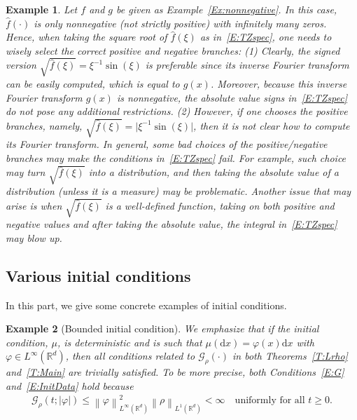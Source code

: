 \documentclass[sn-mathphys]{sn-jnl}%
\renewcommand{\R}{\mathbb{R}}
\newcommand{\Norm}[1]{\left\| #1 \right\|}
\newcommand{\ud}{\ensuremath{\mathrm{d}}}
\numberwithin{equation}{section}
\theoremstyle{thmstyleone}%
\theoremstyle{thmstyletwo}%
\newtheorem{example}{Example}[section]%
\theoremstyle{thmstylethree}%
\begin{document}
\begin{example}\label{Ex:sqrt}
  Let $f$ and $g$ be given as Example~\ref{Ex:nonnegative}. In this case, $\widehat{f}(\cdot)$ is
  only nonnegative (not strictly positive) with infinitely many zeros. Hence, when taking the square
  root of $\widehat{f}(\xi)$ as in~\eqref{E:TZspec}, one needs to wisely select the correct positive
  and negative branches: (1) Clearly, the signed version $\sqrt{\widehat{f}(\xi)} =
  \xi^{-1}\sin(\xi)$ is preferable since its inverse Fourier transform can be easily computed, which
  is equal to $g(x)$. Moreover, because this inverse Fourier transform $g(x)$ is nonnegative, the
  absolute value signs in~\eqref{E:TZspec} do not pose any additional restrictions. (2) However, if
  one chooses the positive branches, namely, $\sqrt{\widehat{f}(\xi)} =
  \lvert\xi^{-1}\sin(\xi)\rvert$, then it is not clear how to compute its Fourier transform. In
  general, some bad choices of the positive/negative branches may make the conditions
  in~\eqref{E:TZspec} fail. For example, such choice may turn $\sqrt{\widehat{f}(\xi)}$ into a
  distribution, and then taking the absolute value of a distribution (unless it is a measure) may be
  problematic. Another issue that may arise is when $\sqrt{\widehat{f}(\xi)}$ is a well-defined
  function, taking on both positive and negative values and after taking the absolute value, the
  integral in~\eqref{E:TZspec} may blow up.
\end{example}

\subsection{Various initial conditions}\label{SS:Init}

In this part, we give some concrete examples of initial conditions.

\begin{example}[Bounded initial condition]\label{Ex:BddInit}
  We emphasize that if the initial condition, $\mu$, is deterministic and is such that $\mu(\ud x) =
  \varphi(x)\ud x$ with $\varphi\in L^\infty(\R^d)$, then all conditions related to
  $\mathcal{G}_\rho(\cdot)$ in both Theorems~\ref{T:Lrho} and~\ref{T:Main} are trivially satisfied.
  To be more precise, both Conditions~\eqref{E:G} and~\eqref{E:InitData} hold because
  \begin{align*}
    \mathcal{G}_\rho(t;\lvert \varphi \rvert) \le \Norm{\varphi}_{L^\infty(\R^d)}^2 \Norm{\rho}_{L^1 (\R^d)}< \infty
    \quad \text{uniformly for all $t\ge 0$.}
  \end{align*}
\end{example}
\end{document}
